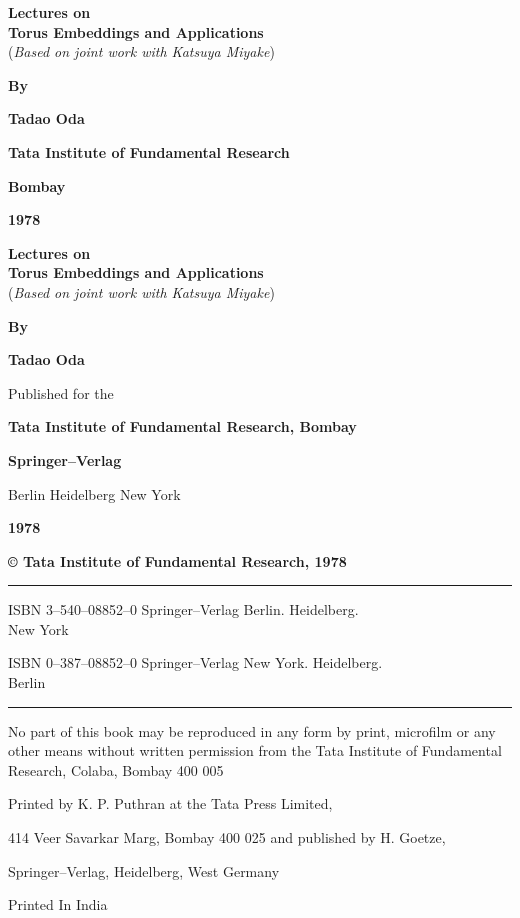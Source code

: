 \thispagestyle{empty}
\begin{center}
{\Large\bf Lectures on}\\[5pt]
{\Large\bf Torus Embeddings and Applications}\\[5pt]
(\textit{Based on joint work with Katsuya Miyake})
\vskip 1cm

{\bf By}
\medskip

{\large\bf Tadao Oda}\\
\vfill

{\bf Tata Institute of Fundamental Research}


{\bf Bombay}


{\bf 1978}

\end{center}
\eject

\thispagestyle{empty}
\begin{center}
{\Large\bf Lectures on}\\[5pt]
{\Large\bf Torus Embeddings and Applications}\\[5pt]
(\textit{Based on joint work with Katsuya Miyake})
\vskip 1cm

{\bf By}
\medskip

{\large\bf Tadao Oda}\\
\vfill

Published for the 

{\bf Tata Institute of Fundamental Research, Bombay}


{\bf Springer--Verlag}


Berlin Heidelberg New York 

{\bf 1978}

\end{center}
\eject

\thispagestyle{empty}

\begin{center}

\vfill

{\bf\copyright \quad 
Tata Institute of Fundamental Research, 1978}

\vfill

\noindent\rule{\textwidth}{1pt}

ISBN 3--540--08852--0 Springer--Verlag Berlin.
Heidelberg.\\ New York

ISBN 0--387--08852--0 Springer--Verlag New York.
Heidelberg.\\ Berlin

\noindent\rule{\textwidth}{1pt}

\vfill

\parbox{0.7\textwidth}{No part of this book may be 
reproduced in any form
by print, microfilm or any other means without written
permission from the Tata Institute of Fundamental 
Research, Colaba, Bombay 400 005}
\vfill

Printed by K. P. Puthran at the Tata Press Limited,

414 Veer Savarkar Marg, Bombay 400 025 and published by H. Goetze,

Springer--Verlag, Heidelberg, West Germany
\vfill

Printed In India

\end{center}
